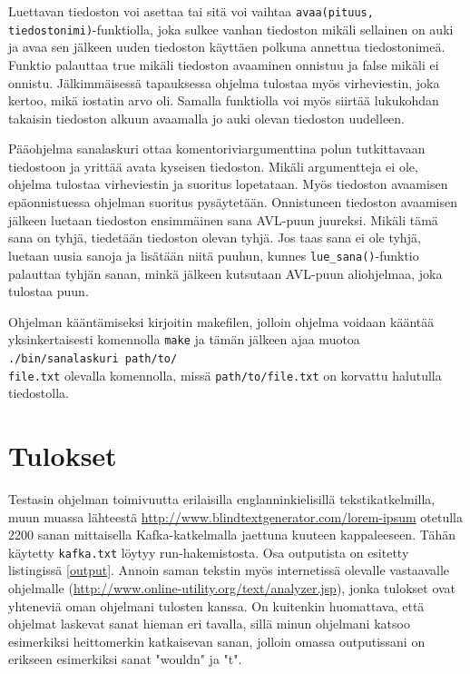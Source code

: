 \documentclass[12pt,a4paper,titlepage]{article}
\begin{document}
Luettavan tiedoston voi asettaa tai sitä voi vaihtaa \texttt{avaa(pituus, tiedostonimi)}-\-funktiolla, joka sulkee vanhan tiedoston mikäli sellainen on auki ja avaa sen jälkeen uuden tiedoston käyttäen polkuna annettua tiedostonimeä. Funktio palauttaa true mikäli tiedoston avaaminen onnistuu ja false mikäli ei onnistu. Jälkimmäisessä tapauksessa ohjelma tulostaa myös virheviestin, joka kertoo, mikä iostatin arvo oli. Samalla funktiolla voi myös siirtää lukukohdan takaisin tiedoston alkuun avaamalla jo auki olevan tiedoston uudelleen.

Pääohjelma sanalaskuri ottaa komentoriviargumenttina polun tutkittavaan tiedostoon ja yrittää avata kyseisen tiedoston. Mikäli argumentteja ei ole, ohjelma tulostaa virheviestin ja suoritus lopetataan. Myös tiedoston avaamisen epäonnistuessa ohjelman suoritus pysäytetään. Onnistuneen tiedoston avaamisen jälkeen luetaan tiedoston ensimmäinen sana AVL-puun juureksi. Mikäli tämä sana on tyhjä, tiedetään tiedoston olevan tyhjä. Jos taas sana ei ole tyhjä, luetaan uusia sanoja ja lisätään niitä puuhun, kunnes \texttt{lue\_sana()}-funktio palauttaa tyhjän sanan, minkä jälkeen kutsutaan AVL-puun aliohjelmaa, joka tulostaa puun.

Ohjelman kääntämiseksi kirjoitin makefilen, jolloin ohjelma voidaan kääntää yksinkertaisesti komennolla \texttt{make} ja tämän jälkeen ajaa muotoa \texttt{./bin/sanalaskuri path/to/\\file.txt} %
olevalla komennolla, missä \texttt{path/to/file.txt} on korvattu halutulla tiedostolla.

\section{Tulokset}
Testasin ohjelman toimivuutta erilaisilla englanninkielisillä tekstikatkelmilla, muun muassa lähteestä \url{http://www.blindtextgenerator.com/lorem-ipsum} otetulla 2200 sanan mittaisella Kafka-katkelmalla jaettuna kuuteen kappaleeseen. Tähän käytetty \texttt{kafka.txt} löytyy run-hakemistosta. Osa outputista on esitetty listingissä \ref{output}. Annoin saman tekstin myös internetissä olevalle vastaavalle ohjelmalle (\url{http://www.online-utility.org/text/analyzer.jsp}), jonka tulokset ovat yhteneviä oman ohjelmani tulosten kanssa. On kuitenkin huomattava, että ohjelmat laskevat sanat hieman eri tavalla, sillä minun ohjelmani katsoo esimerkiksi heittomerkin katkaisevan sanan, jolloin omassa outputissani on erikseen esimerkiksi sanat "wouldn" ja "t".
\end{document}
